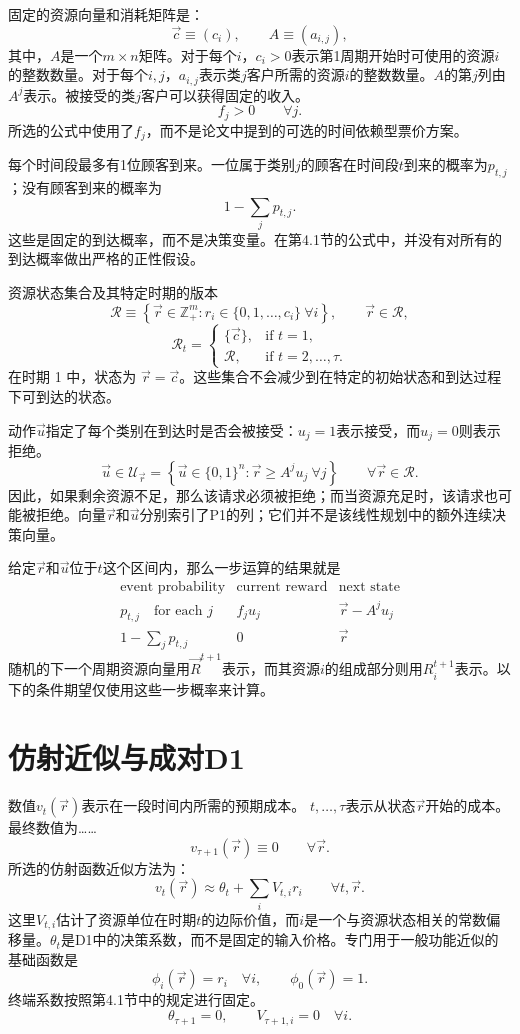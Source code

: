 \documentclass{article}
\begin{document}
固定的资源向量和消耗矩阵是：
\[
\vec c\equiv(c_i),\qquad A\equiv(a_{i,j}),
\]
其中，\(A\)是一个\(m\times n\)矩阵。对于每个\(i\)，\(c_i>0\)表示第1周期开始时可使用的资源\(i\)的整数数量。对于每个\(i,j\)，\(a_{i,j}\)表示类\(j\)客户所需的资源\(i\)的整数数量。\(A\)的第\(j\)列由\(A^j\)表示。被接受的类\(j\)客户可以获得固定的收入。
\[
f_j>0\qquad\forall j.
\]
所选的公式中使用了\(f_j\)，而不是论文中提到的可选的时间依赖型票价方案。

每个时间段最多有1位顾客到来。一位属于类别\(j\)的顾客在时间段\(t\)到来的概率为\(p_{t,j}\)；没有顾客到来的概率为
\[
1-\sum_j p_{t,j}.
\]
这些是固定的到达概率，而不是决策变量。在第4.1节的公式中，并没有对所有的到达概率做出严格的正性假设。

资源状态集合及其特定时期的版本
\[
\mathscr R\equiv
\left\{\vec r\in\mathbb Z_+^m:
 r_i\in\{0,1,\ldots,c_i\}\ \forall i\right\},
\qquad \vec r\in\mathscr R,
\]
\[
\mathscr R_t=
\begin{cases}
\{\vec c\},&\text{if }t=1,\\
\mathscr R,&\text{if }t=2,\ldots,\tau.
\end{cases}
\]
在时期 1 中，状态为 \(\vec r=\vec c\)。这些集合不会减少到在特定的初始状态和到达过程下可到达的状态。

动作\(\vec u\)指定了每个类别在到达时是否会被接受：\(u_j=1\)表示接受，而\(u_j=0\)则表示拒绝。
\[
\vec u\in\mathscr U_{\vec r}
=\left\{\vec u\in\{0,1\}^n:
\vec r\geqslant A^j u_j\ \forall j\right\}
\qquad\forall\vec r\in\mathscr R.
\]
因此，如果剩余资源不足，那么该请求必须被拒绝；而当资源充足时，该请求也可能被拒绝。向量\(\vec r\)和\(\vec u\)分别索引了P1的列；它们并不是该线性规划中的额外连续决策向量。

给定\(\vec r\)和\(\vec u\)位于\(t\)这个区间内，那么一步运算的结果就是
\[
\begin{array}{c|c|c}
\text{event probability}&\text{current reward}&\text{next state}\\ \hline
p_{t,j}\quad\text{for each }j&f_j u_j&\vec r-A^j u_j\\
1-\sum_jp_{t,j}&0&\vec r
\end{array}
\]
随机的下一个周期资源向量用\(\vec R^{t+1}\)表示，而其资源\(i\)的组成部分则用\(R_i^{t+1}\)表示。以下的条件期望仅使用这些一步概率来计算。

\section*{仿射近似与成对D1}

数值\(v_t(\vec r)\)表示在一段时间内所需的预期成本。  
\(t,\ldots,\tau\)表示从状态\(\vec r\)开始的成本。最终数值为……
\[
v_{\tau+1}(\vec r)\equiv0\qquad\forall\vec r.
\]
所选的仿射函数近似方法为：
\begin{equation}
v_t(\vec r)\approx\theta_t+\sum_i V_{t,i}r_i
\qquad\forall t,\vec r.
\tag{14}
\end{equation}
这里\(V_{t,i}\)估计了资源单位在时期\(t\)的边际价值，而\(i\)是一个与资源状态相关的常数偏移量。\(\theta_t\)是D1中的决策系数，而不是固定的输入价格。专门用于一般功能近似的基础函数是
\[
\phi_i(\vec r)=r_i\quad\forall i,
\qquad \phi_0(\vec r)=1.
\]
终端系数按照第4.1节中的规定进行固定。
\[
\theta_{\tau+1}=0,\qquad V_{\tau+1,i}=0\quad\forall i.
\]
\end{document}
